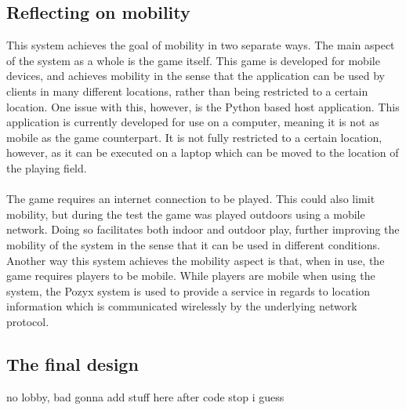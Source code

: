 \subsection{Reflecting on mobility}
This system achieves the goal of mobility in two separate ways.
The main aspect of the system as a whole is the game itself.
This game is developed for mobile devices, and achieves mobility in the sense that the application can be used by clients in many different locations, rather than being restricted to a certain location.
One issue with this, however, is the Python based host application.
This application is currently developed for use on a computer, meaning it is not as mobile as the game counterpart.
It is not fully restricted to a certain location, however, as it can be executed on a laptop which can be moved to the location of the playing field.
\\\\
The game requires an internet connection to be played.
This could also limit mobility, but during the test  the game was played outdoors using a mobile network.
Doing so facilitates both indoor and outdoor play, further improving the mobility of the system in the sense that it can be used in different conditions.
Another way this system achieves the mobility aspect is that, when in use, the game requires players to be mobile.
While players are mobile when using the system, the Pozyx system is used to provide a service in regards to location information which is communicated wirelessly by the underlying network protocol.


\subsection{The final design}
no lobby, bad
gonna add stuff here after code stop i guess

